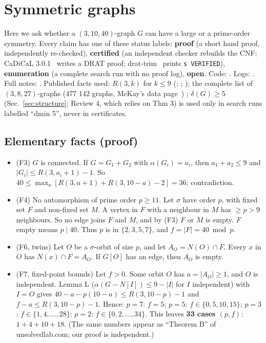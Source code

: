 \section{Symmetric graphs}\label{sec:sym}

Here we ask whether a $(3,10,40)$-graph $G$ can have a large or a prime-order symmetry. Every claim has
one of these status labels:
\textbf{proof} (a short hand proof, independently re-checked), \textbf{certified} (an independent checker rebuilds the CNF;
CaDiCaL 3.0.1~\cite{CaDiCaL24} writes a DRAT proof; drat-trim~\cite{DRATtrim14} prints \texttt{s VERIFIED}), \textbf{enumeration} (a complete search
run with no proof log), \textbf{open}.
Code: . Logs: . Full notes: .
Published facts used: $R(3,k)$ for $k \le 9$ (\cite[rev.~18, Table I]{DS1}; \cite{McZ}; \cite{GrR}); the complete list of
$(3,8,27)$-graphs (477 142 graphs, McKay's data page~\cite{McKayWeb}) \cite{McZ}; $\delta(G) \ge 5$ (Sec.~\ref{sec:structure}; Review 4,
which relies on \cite{GR} Thm 3) is used only in search runs labelled ``dmin 5'', never in certificates.

\subsection{Elementary facts (proof)}\label{sec:sym-elem}
\begin{itemize}
\item (F3) $G$ is connected. If $G = G_1 + G_2$ with $\alpha(G_i) = a_i$, then $a_1 + a_2 \le 9$ and
  $|G_i| \le R(3, a_i + 1) - 1$. So $40 \le \max_a [R(3,a+1) + R(3,10-a) - 2] = 36$; contradiction.
\item (F4) No automorphism of prime order $p \ge 11$. Let $\sigma$ have order $p$, with fixed set $F$ and
  non-fixed set $M$. A vertex in $F$ with a neighbour in $M$ has $\ge p > 9$ neighbours. So no edge joins $F$
  and $M$, and by (F3) $F$ or $M$ is empty. $F$ empty means $p \mid 40$. Thus $p$ is in $\{2, 3, 5, 7\}$, and $f = |F| = 40 \bmod p$.
\item (F6, twins) Let $O$ be a $\sigma$-orbit of size $p$, and let $A_O = N(O) \cap F$. Every $x$ in $O$ has $N(x) \cap F = A_O$.
  If $G[O]$ has an edge, then $A_O$ is empty.
\item (F7, fixed-point bounds) Let $f > 0$. Some orbit $O$ has $a = |A_O| \ge 1$, and $O$ is independent.
  Lemma L ($\alpha(G - N[I]) \le 9 - |I|$ for $I$ independent) with $I = O$ gives
  $40 - a - p(10 - a) \le R(3, 10-p) - 1$ and $f - a \le R(3, 10-p) - 1$. Hence:
  $p = 7$: $f = 5$; $p = 5$: $f \in \{0,5,10,15\}$; $p = 3$: $f \in \{1,4,\dots,28\}$; $p = 2$: $f \in \{0,2,\dots,34\}$.
  This leaves \textbf{33 cases $(p, f)$}: $1 + 4 + 10 + 18$.
  (The same numbers appear as ``Theorem B'' of unsolvedlab.com; our proof is independent.)
\end{itemize}

